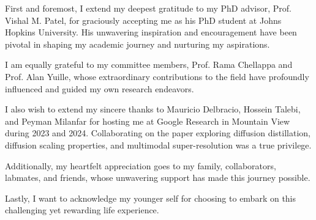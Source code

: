 

First and foremost, I extend my deepest gratitude to my PhD advisor, Prof. Vishal M. Patel, for graciously accepting me as his PhD student at Johns Hopkins University. His unwavering inspiration and encouragement have been pivotal in shaping my academic journey and nurturing my aspirations.

I am equally grateful to my committee members, Prof. Rama Chellappa and Prof. Alan Yuille, whose extraordinary contributions to the field have profoundly influenced and guided my own research endeavors.

I also wish to extend my sincere thanks to Mauricio Delbracio, Hossein Talebi, and Peyman Milanfar for hosting me at Google Research in Mountain View during 2023 and 2024. Collaborating on the paper exploring diffusion distillation, diffusion scaling properties, and multimodal super-resolution was a true privilege.

Additionally, my heartfelt appreciation goes to my family, collaborators, labmates, and friends, whose unwavering support has made this journey possible.

Lastly, I want to acknowledge my younger self for choosing to embark on this challenging yet rewarding life experience.
